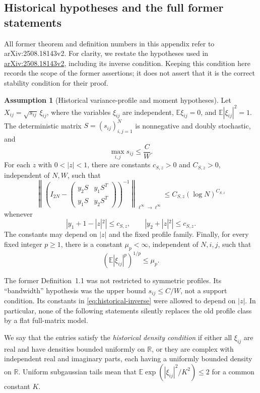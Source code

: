 \documentclass[11pt,reqno]{amsart}
\numberwithin{equation}{section}
\theoremstyle{plain}
\theoremstyle{definition}
\newtheorem{assumption}[theorem]{Assumption}
\theoremstyle{remark}
\begin{document}
\subsection{Historical hypotheses and the full former statements}

All former theorem and definition numbers in this appendix refer to
arXiv:2508.18143v2. For clarity, we restate the hypotheses used in \href{https://arxiv.org/abs/2508.18143v2}{arXiv:2508.18143v2},
including its inverse condition.  Keeping this condition here records the
scope of the former assertions; it does not assert that it is the correct
stability condition for their proof.

\begin{assumption}[Historical variance-profile and moment hypotheses]
\label{ass:historical-profile}
Let \(X_{ij}=\sqrt{s_{ij}}\,\xi_{ij}\), where the variables \(\xi_{ij}\)
are independent, \(\mathbb E\xi_{ij}=0\), and
\(\mathbb E|\xi_{ij}|^2=1\).  The deterministic matrix
\(S=(s_{ij})_{i,j=1}^N\) is nonnegative and doubly stochastic, and
\[
 \max_{i,j}s_{ij}\leq \frac{C}{W}.
\]
For each \(z\) with \(0<|z|<1\), there are constants
\(c_{S,z}>0\) and \(C_{S,z}>0\), independent of \(N,W\), such that
\begin{equation}
 \left\|
 \left(I_{2N}-
 \begin{pmatrix}
  y_2S&y_1S^T\\
  y_1S&y_2S^T
 \end{pmatrix}\right)^{-1}
 \right\|_{\ell^\infty\to\ell^\infty}
 \leq C_{S,z}(\log N)^{C_{S,z}}
 \label{eq:historical-inverse}
\end{equation}
whenever
\[
 |y_1+1-|z|^2|\leq c_{S,z},\qquad
 |y_2+|z|^2|\leq c_{S,z}.
\]
The constants may depend on \(|z|\) and the fixed profile family.
Finally, for every fixed integer \(p\geq1\),
there is a constant \(\mu_p<\infty\), independent of \(N,i,j\), such that
\[
 (\mathbb E|\xi_{ij}|^p)^{1/p}\leq\mu_p.
\]
\end{assumption}

The former Definition~1.1 was not restricted to symmetric profiles.
Its ``bandwidth'' hypothesis was the upper bound \(s_{ij}\leq C/W\),
not a support condition.  Its constants in
\eqref{eq:historical-inverse} were allowed to depend on \(|z|\).
In particular, none of the following statements silently
replaces the old profile class by a flat full-matrix model.

We say that the entries satisfy the \emph{historical density condition}
if either all \(\xi_{ij}\) are real and have densities bounded uniformly
on \(\mathbb R\), or they are complex with independent real and imaginary
parts, each having a uniformly bounded density on \(\mathbb R\).
Uniform subgaussian tails mean that
\(\mathbb E\exp(|\xi_{ij}|^2/K^2)\leq2\) for a common constant \(K\).
\end{document}
